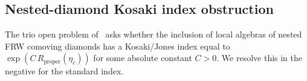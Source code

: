 
\subsection{Nested-diamond Kosaki index obstruction}\label{ssec:nested-diamond}

The trio open problem of~\cite[item 4]{KrylovTrioClose2026} asks whether the
inclusion of local algebras of nested FRW comoving diamonds has a Kosaki/Jones
index equal to $\exp(C\,R_{\text{proper}}(\eta_c))$ for some absolute constant
$C>0$. We resolve this in the negative for the standard index.

